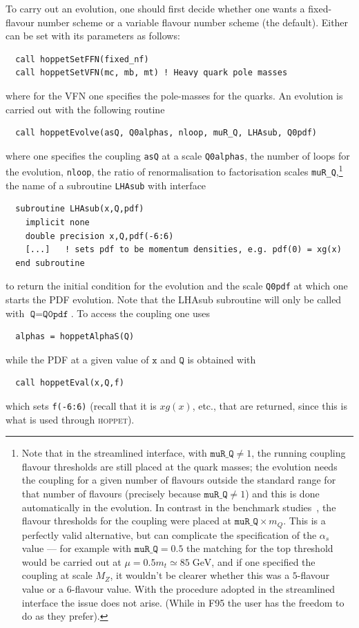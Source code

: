 \documentclass[12pt]{article}
\newcommand{\GeV}{\;\mathrm{GeV}}
\newcommand{\as}{\alpha_s}
\newcommand{\hoppet}{\textsc{hoppet}\xspace}
\newcommand{\ttt}[1]{\texttt{#1}}
\begin{document}
To carry out an evolution, one should first decide whether one wants a
fixed-flavour number scheme or a variable flavour number scheme (the
default). Either can be set with its parameters as follows:
\begin{lstlisting}
  call hoppetSetFFN(fixed_nf)
  call hoppetSetVFN(mc, mb, mt) ! Heavy quark pole masses
\end{lstlisting}
where for the VFN one specifies the pole-masses for the quarks. An
evolution is carried out with the following routine
\begin{lstlisting}
  call hoppetEvolve(asQ, Q0alphas, nloop, muR_Q, LHAsub, Q0pdf)
\end{lstlisting}
where one specifies the coupling \ttt{asQ} at a scale \ttt{Q0alphas},
the number of loops for the evolution, \ttt{nloop}, the ratio of
renormalisation to factorisation scales \ttt{muR\_Q},\footnote{Note
  that in the streamlined interface, with $\ttt{muR\_Q}\ne 1$, the running
  coupling flavour thresholds are still placed at the quark masses;
  the evolution needs the coupling for a given number of flavours
  outside the standard range for that number of flavours (precisely
  because $\ttt{muR\_Q}\ne 1$) and this is done automatically in the
  evolution. In contrast in the benchmark studies~\cite{Benchmarks},
  the flavour thresholds for the coupling were placed at $\ttt{muR\_Q}
  \times m_Q$.  This is a perfectly valid alternative, but can
  complicate the specification of the $\as$ value --- for example with
  $\ttt{muR\_Q} = 0.5$ the matching for the top threshold would be
  carried out at $\mu = 0.5 m_t \simeq 85 \GeV$, and if one specified
  the coupling at scale $M_Z$, it wouldn't be clearer whether this was
  a $5$-flavour value or a $6$-flavour value. With the procedure
  adopted in the streamlined interface the issue does not arise. (While in
  F95 the user has the freedom to do as they prefer). } %
the name of a subroutine \ttt{LHAsub} with interface
\begin{lstlisting}
  subroutine LHAsub(x,Q,pdf)
    implicit none
    double precision x,Q,pdf(-6:6)
    [...]   ! sets pdf to be momentum densities, e.g. pdf(0) = xg(x)
  end subroutine 
\end{lstlisting}
to return the initial condition for the evolution and the scale
\ttt{Q0pdf} at which one starts the PDF evolution. Note that the
LHAsub subroutine will only be called with $\ttt{Q}=\ttt{Q0pdf}$.
To access the coupling one uses
\begin{lstlisting}
  alphas = hoppetAlphaS(Q)
\end{lstlisting}
while the PDF at a given value of $\ttt{x}$ and $\ttt{Q}$ is obtained with 
\begin{lstlisting}
  call hoppetEval(x,Q,f)
\end{lstlisting}
which sets \ttt{f(-6:6)} (recall that it is $xg(x)$, etc., that are
returned, since this is what is
used through \hoppet).
\end{document}
